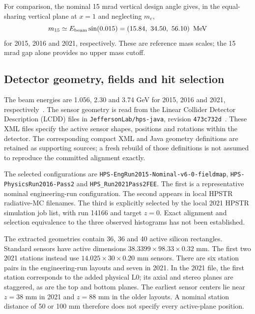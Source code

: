 For comparison, the nominal 15 mrad vertical design angle gives, in the
equal-sharing vertical plane at $x=1$ and neglecting $m_e$,
\begin{equation}
 m_{15}\simeq E_{\rm beam}\sin(0.015)
   =\left(15.84,\ 34.50,\ 56.10\right)\ {\rm MeV}
 \label{v571:fifteen-mrad-reference}
\end{equation}
for 2015, 2016 and 2021, respectively. These are reference mass scales;
the 15 mrad gap alone provides no upper mass cutoff.

\subsection{Detector geometry, fields and hit selection}
\label{v571:geometry}
The beam energies are 1.056, 2.30 and 3.74 GeV for 2015, 2016 and 2021,
respectively~\cite{v571:HPS2022,v571:HPS2015,v571:HPS2016}.
The sensor geometry is read from the Linear Collider Detector Description
(LCDD) files in \texttt{JeffersonLab/hps-java}, revision
\texttt{473c732d}~\cite{v571:geometry-source}. These XML files specify the
active sensor shapes, positions and rotations within the detector.
The corresponding compact XML and Java geometry definitions are retained as
supporting sources; a fresh rebuild of those definitions is not assumed to
reproduce the committed alignment exactly.

The selected configurations are
\nolinkurl{HPS-EngRun2015-Nominal-v6-0-fieldmap},
\nolinkurl{HPS-PhysicsRun2016-Pass2} and
\nolinkurl{HPS_Run2021Pass2FEE}. The first is a representative nominal
engineering-run configuration. The second appears in local HPSTR radiative-MC
filenames. The third is explicitly selected by the local 2021 HPSTR simulation
job list, with run 14166 and target $z=0$. Exact alignment and selection
equivalence to the three observed histograms has not been established.

The extracted geometries contain 36, 36 and 40 active silicon rectangles.
Standard sensors have active dimensions
$38.3399\times98.33\times0.32$ mm. The first two 2021 stations instead use
$14.025\times30\times0.20$ mm sensors. There are six station pairs in the
engineering-run layouts and seven in 2021. In the 2021 file, the first station
corresponds to the added physical L0; its axial and stereo planes are staggered,
as are the top and bottom planes. The earliest sensor centers lie near
$z=38$ mm in 2021 and $z=88$ mm in the older layouts. A nominal station
distance of 50 or 100 mm therefore does not specify every active-plane position.

